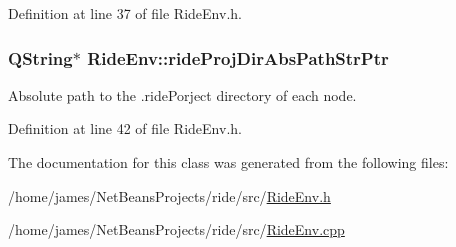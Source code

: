 Definition at line 37 of file Ride\-Env.\-h.

\hypertarget{class_ride_env_aa809a64cf5c8f8c91cefc2a2c19fd225}{
\subsubsection[{ride\-Proj\-Dir\-Abs\-Path\-Str\-Ptr}]{\setlength{\rightskip}{0pt plus 5cm}Q\-String$\ast$ Ride\-Env\-::ride\-Proj\-Dir\-Abs\-Path\-Str\-Ptr\hspace{0.3cm}{\ttfamily [private]}}}\label{class_ride_env_aa809a64cf5c8f8c91cefc2a2c19fd225}
Absolute path to the .ride\-Porject directory of each node. 

Definition at line 42 of file Ride\-Env.\-h.



The documentation for this class was generated from the following files\-:\begin{DoxyCompactItemize}
\item 
/home/james/\-Net\-Beans\-Projects/ride/src/\hyperlink{_ride_env_8h}{Ride\-Env.\-h}\item 
/home/james/\-Net\-Beans\-Projects/ride/src/\hyperlink{_ride_env_8cpp}{Ride\-Env.\-cpp}\end{DoxyCompactItemize}

